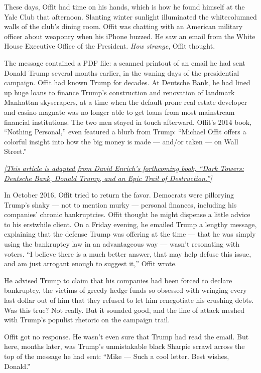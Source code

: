 These days, Offit had time on his hands, which is how he found himself
at the Yale Club that afternoon. Slanting winter sunlight illuminated
the white­columned walls of the club's dining room. Offit was chatting
with an American military officer about weaponry when his iPhone buzzed.
He saw an email from the White House Executive Office of the President.
\emph{How strange}, Offit thought.

The message contained a PDF file: a scanned printout of an email he had
sent Donald Trump several months earlier, in the waning days of the
presidential campaign. Offit had known Trump for decades. At ­Deutsche
Bank, he had lined up huge loans to finance Trump's construction and
renovation of landmark Manhattan skyscrapers, at a time when the
default-­prone real estate developer and casino magnate was no longer
able to get loans from most mainstream financial institutions. The two
men stayed in touch afterward. Offit's 2014 book, ``Nothing Personal,''
even featured a blurb from Trump: ``Michael Offit offers a colorful
insight into how the big money is made --- and/or taken --- on Wall
Street.''

\emph{\href{https://www.harpercollins.com/9780062878816/dark-towers/}{{[}This
article is adapted from David Enrich's forthcoming book, ``Dark Towers:
Deutsche Bank, Donald Trump, and an Epic Trail of Destruction.''{]}}}

In October 2016, Offit tried to return the favor. Democrats were
pillorying Trump's shaky --- not to mention murky --- personal finances,
including his companies' chronic bankruptcies. Offit thought he might
dispense a little advice to his erstwhile client. On a Friday evening,
he emailed Trump a lengthy message, explaining that the defense Trump
was offering at the time --- that he was simply using the bankruptcy law
in an advantageous way --- wasn't resonating with voters. ``I believe
there is a much better answer, that may help defuse this issue, and am
just arrogant enough to suggest it,'' Offit wrote.

He advised Trump to claim that his companies had been forced to declare
bankruptcy, the victims of greedy hedge funds so obsessed with wringing
every last dollar out of him that they refused to let him renegotiate
his crushing debts. Was this true? Not really. But it sounded good, and
the line of attack meshed with Trump's populist rhetoric on the campaign
trail.

Offit got no response. He wasn't even sure that Trump had read the
email. But here, months later, was Trump's unmistakable black Sharpie
scrawl across the top of the message he had sent: ``Mike --- Such a cool
letter. Best wishes, Donald.''

